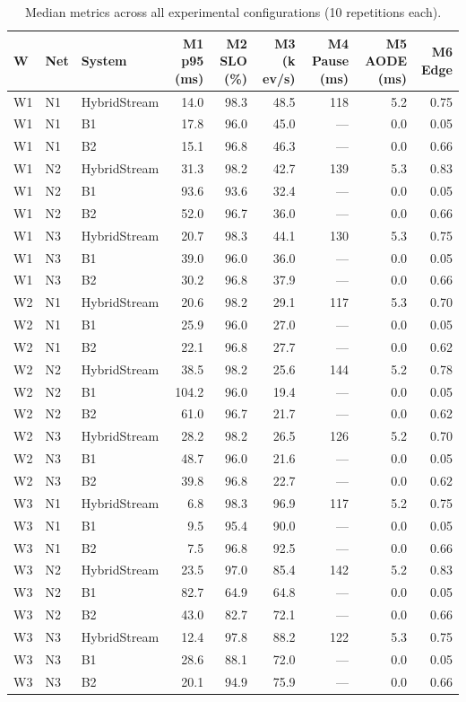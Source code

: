 \begin{table}[htbp]
\centering
\caption{Median metrics across all experimental configurations (10 repetitions each).}
\label{tab:summary_results}
\small
\begin{tabular}{lll|rrrrrr}
\toprule
W & Net & System & M1 p95 (ms) & M2 SLO (\%) & M3 (k ev/s) & M4 Pause (ms) & M5 AODE (ms) & M6 Edge \\
\midrule
W1 & N1 & HybridStream & 14.0 & 98.3 & 48.5 & 118 & 5.2 & 0.75 \\
W1 & N1 & B1 & 17.8 & 96.0 & 45.0 & — & 0.0 & 0.05 \\
W1 & N1 & B2 & 15.1 & 96.8 & 46.3 & — & 0.0 & 0.66 \\
W1 & N2 & HybridStream & 31.3 & 98.2 & 42.7 & 139 & 5.3 & 0.83 \\
W1 & N2 & B1 & 93.6 & 93.6 & 32.4 & — & 0.0 & 0.05 \\
W1 & N2 & B2 & 52.0 & 96.7 & 36.0 & — & 0.0 & 0.66 \\
W1 & N3 & HybridStream & 20.7 & 98.3 & 44.1 & 130 & 5.3 & 0.75 \\
W1 & N3 & B1 & 39.0 & 96.0 & 36.0 & — & 0.0 & 0.05 \\
W1 & N3 & B2 & 30.2 & 96.8 & 37.9 & — & 0.0 & 0.66 \\
W2 & N1 & HybridStream & 20.6 & 98.2 & 29.1 & 117 & 5.3 & 0.70 \\
W2 & N1 & B1 & 25.9 & 96.0 & 27.0 & — & 0.0 & 0.05 \\
W2 & N1 & B2 & 22.1 & 96.8 & 27.7 & — & 0.0 & 0.62 \\
W2 & N2 & HybridStream & 38.5 & 98.2 & 25.6 & 144 & 5.2 & 0.78 \\
W2 & N2 & B1 & 104.2 & 96.0 & 19.4 & — & 0.0 & 0.05 \\
W2 & N2 & B2 & 61.0 & 96.7 & 21.7 & — & 0.0 & 0.62 \\
W2 & N3 & HybridStream & 28.2 & 98.2 & 26.5 & 126 & 5.2 & 0.70 \\
W2 & N3 & B1 & 48.7 & 96.0 & 21.6 & — & 0.0 & 0.05 \\
W2 & N3 & B2 & 39.8 & 96.8 & 22.7 & — & 0.0 & 0.62 \\
W3 & N1 & HybridStream & 6.8 & 98.3 & 96.9 & 117 & 5.2 & 0.75 \\
W3 & N1 & B1 & 9.5 & 95.4 & 90.0 & — & 0.0 & 0.05 \\
W3 & N1 & B2 & 7.5 & 96.8 & 92.5 & — & 0.0 & 0.66 \\
W3 & N2 & HybridStream & 23.5 & 97.0 & 85.4 & 142 & 5.2 & 0.83 \\
W3 & N2 & B1 & 82.7 & 64.9 & 64.8 & — & 0.0 & 0.05 \\
W3 & N2 & B2 & 43.0 & 82.7 & 72.1 & — & 0.0 & 0.66 \\
W3 & N3 & HybridStream & 12.4 & 97.8 & 88.2 & 122 & 5.3 & 0.75 \\
W3 & N3 & B1 & 28.6 & 88.1 & 72.0 & — & 0.0 & 0.05 \\
W3 & N3 & B2 & 20.1 & 94.9 & 75.9 & — & 0.0 & 0.66 \\
\bottomrule
\end{tabular}
\end{table}